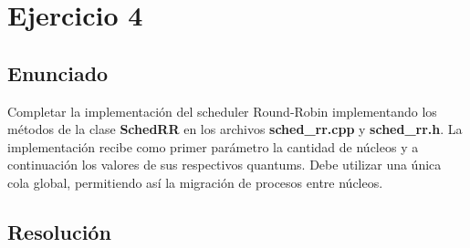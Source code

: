 \section{Ejercicio 4}

\subsection{Enunciado}
Completar la implementación del scheduler Round-Robin implementando los métodos de la clase \textbf{SchedRR} en los archivos \textbf{sched\_rr.cpp} y \textbf{sched\_rr.h}. La implementación recibe como primer parámetro la cantidad de núcleos y a continuación los valores de sus respectivos quantums. Debe utilizar una única cola global, permitiendo así la migración de procesos entre núcleos.


\subsection{Resolución}
